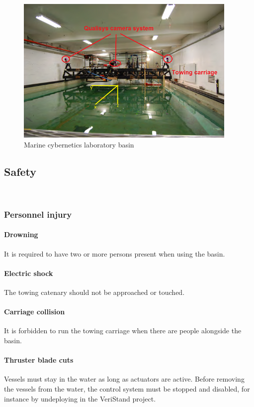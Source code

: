 \documentclass[a4paper,english]{report}
\begin{document}
\begin{figure}[h!]
	\centering \includegraphics[width=0.95\textwidth]{fig/mc_lab} 
	\caption{Marine cybernetics laboratory basin}
	\label{fig: Marine cybernetics laboratory basin-1}
\end{figure}

\subsection{Safety}\
\subsubsection{Personnel injury}
\paragraph{Drowning}
It is required to have two or more persons present when using the basin.
\paragraph{Electric shock}
The towing catenary should not be approached or touched.
\paragraph{Carriage collision}
It is forbidden to run the towing carriage when there are people alongside the basin.
\paragraph{Thruster blade cuts}
Vessels must stay in the water as long as actuators are active. Before removing the vessels from the water, the control system must be stopped and disabled, for instance by undeploying in the VeriStand project.
\end{document}
